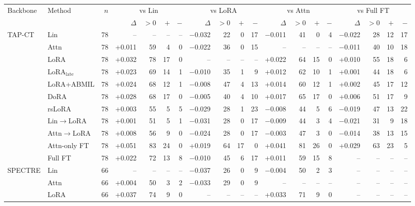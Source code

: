 \setlength{\tabcolsep}{3.5pt}
\begin{tabular}{@{}llrrrrrrrrrrrrrrrrr@{}}
\toprule
Backbone & Method & $n$ & \multicolumn{4}{c}{vs Lin} & \multicolumn{4}{c}{vs LoRA} & \multicolumn{4}{c}{vs Attn} & \multicolumn{4}{c}{vs Full FT} \\
\cmidrule(lr){4-7}\cmidrule(lr){8-11}\cmidrule(lr){12-15}\cmidrule(lr){16-19}
 & & & $\Delta$ & $>0$ & $+$ & $-$ & $\Delta$ & $>0$ & $+$ & $-$ & $\Delta$ & $>0$ & $+$ & $-$ & $\Delta$ & $>0$ & $+$ & $-$ \\
\midrule
TAP-CT & Lin & 78 & -- & -- & -- & -- & $-$0.032 & 22 & 0 & 17 & $-$0.011 & 41 & 0 & 4 & $-$0.022 & 28 & 12 & 17 \\
 & Attn & 78 & +0.011 & 59 & 4 & 0 & $-$0.022 & 36 & 0 & 15 & -- & -- & -- & -- & $-$0.011 & 40 & 10 & 18 \\
 & LoRA & 78 & +0.032 & 78 & 17 & 0 & -- & -- & -- & -- & +0.022 & 64 & 15 & 0 & +0.010 & 55 & 18 & 6 \\
 & LoRA$_{\text{late}}$ & 78 & +0.023 & 69 & 14 & 1 & $-$0.010 & 35 & 1 & 9 & +0.012 & 62 & 10 & 1 & +0.001 & 44 & 18 & 6 \\
 & LoRA+ABMIL & 78 & +0.024 & 68 & 12 & 1 & $-$0.008 & 47 & 4 & 13 & +0.014 & 60 & 12 & 1 & +0.002 & 45 & 17 & 12 \\
 & DoRA & 78 & +0.028 & 68 & 17 & 0 & $-$0.005 & 40 & 4 & 10 & +0.017 & 65 & 17 & 0 & +0.006 & 51 & 17 & 9 \\
 & rsLoRA & 78 & +0.003 & 55 & 5 & 5 & $-$0.029 & 28 & 1 & 23 & $-$0.008 & 44 & 5 & 6 & $-$0.019 & 47 & 13 & 22 \\
 & Lin$\to$LoRA & 78 & +0.001 & 51 & 5 & 1 & $-$0.031 & 28 & 0 & 17 & $-$0.009 & 44 & 3 & 4 & $-$0.021 & 31 & 9 & 18 \\
 & Attn$\to$LoRA & 78 & +0.008 & 56 & 9 & 0 & $-$0.024 & 28 & 0 & 17 & $-$0.003 & 47 & 3 & 0 & $-$0.014 & 38 & 13 & 15 \\
 & Attn-only FT & 78 & +0.051 & 83 & 24 & 0 & +0.019 & 64 & 17 & 0 & +0.041 & 81 & 26 & 0 & +0.029 & 63 & 23 & 5 \\
 & Full FT & 78 & +0.022 & 72 & 13 & 8 & $-$0.010 & 45 & 6 & 17 & +0.011 & 59 & 15 & 8 & -- & -- & -- & -- \\
\addlinespace
SPECTRE & Lin & 66 & -- & -- & -- & -- & $-$0.037 & 26 & 0 & 9 & $-$0.004 & 50 & 2 & 3 & -- & -- & -- & -- \\
 & Attn & 66 & +0.004 & 50 & 3 & 2 & $-$0.033 & 29 & 0 & 9 & -- & -- & -- & -- & -- & -- & -- & -- \\
 & LoRA & 66 & +0.037 & 74 & 9 & 0 & -- & -- & -- & -- & +0.033 & 71 & 9 & 0 & -- & -- & -- & -- \\

\end{tabular}
